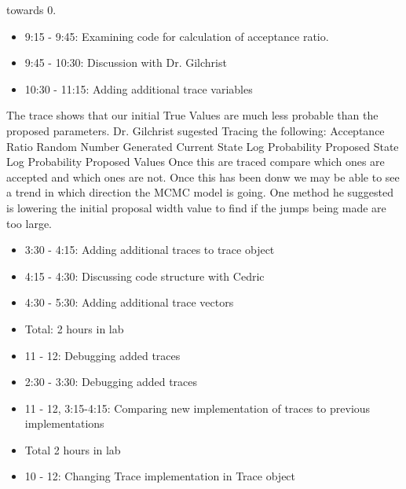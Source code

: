 \documentclass[12pt,hyperref]{labbook}
\begin{document}
towards 0.
\begin{itemize}
    \item 9:15 - 9:45: Examining code for calculation of acceptance ratio.
    \item 9:45 - 10:30: Discussion with Dr. Gilchrist
    \item 10:30 - 11:15: Adding additional trace variables
\end{itemize}
The trace shows that our initial True Values are much less probable than the proposed parameters. Dr. Gilchrist sugested Tracing the following:
Acceptance Ratio
Random Number Generated
Current State Log Probability
Proposed State Log Probability
Proposed Values
Once this are traced compare which ones are accepted and which ones are not. Once this has been donw we may be able to see a trend
in which direction the MCMC model is going. One method he suggested is lowering the initial proposal width value to find if the jumps
being made are too large.
\begin{itemize}
    \item 3:30 - 4:15: Adding additional traces to trace object
    \item 4:15 - 4:30: Discussing code structure with Cedric
    \item 4:30 - 5:30: Adding additional trace vectors
    \item Total: 2 hours in lab
\end{itemize}
\begin{itemize}
    \item 11 - 12: Debugging added traces
    \item 2:30 - 3:30: Debugging added traces
\end{itemize}
\begin{itemize}
    \item 11 - 12, 3:15-4:15: Comparing new implementation of traces to previous implementations
    \item Total 2 hours in lab
\end{itemize}
\begin{itemize}
    \item 10 - 12: Changing Trace implementation in Trace object
\end{itemize}
\end{document}
